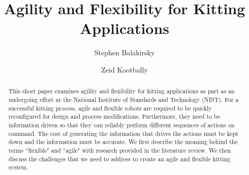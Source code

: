 \documentclass[final,3p,12pt]{elsarticle}
\begin{document}
\begin{frontmatter}



\title{Agility and Flexibility for Kitting Applications}


\author[NIST]{Stephen Balakirsky}
\author[UMD]{Zeid Kootbally}

\address[NIST]{National Institute of Standards and Technology, Gaithersburg, MD USA}
\address[UMD]{University of Maryland, College Park, MD, USA}

 \begin{abstract}
This short paper examines agility and flexibility for kitting applications as part as an undergoing effort at the National Institute of Standards and Technology (NIST). For a successful kitting process, agile and flexible robots are required to be quickly reconfigured for design and process modifications. Furthermore, they need to be information driven so that they can reliably perform different sequences of actions on command. The cost of generating the information that drives the actions must be kept down and the information must be accurate. We first describe the meaning behind the terms ``flexible" and ``agile" with research provided in the literature review. We then discuss the challenges that we need to address to create an agile and flexible kitting system.

 \end{abstract}


\end{frontmatter}
\end{document}
